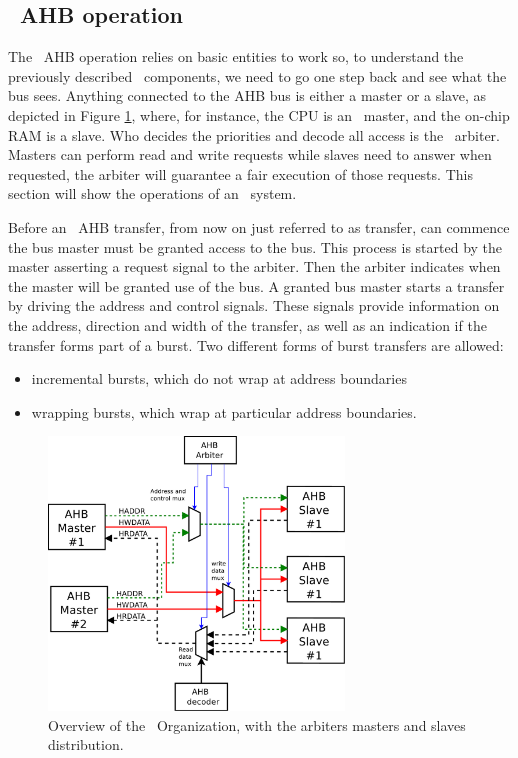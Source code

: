 \subsection{\amba~AHB operation}
\label{subsec:ahbops}
The \amba~AHB operation relies on basic entities to work so, to understand the previously described \amba~components, we need to go one step back and see what the bus sees.  Anything connected to the AHB bus is either a master or a slave, as depicted in Figure \ref{fig:internorg}, where, for instance, the CPU is an \amba~master, and the on-chip RAM is a slave. Who decides the priorities and decode all access is the \amba~arbiter. Masters can perform read and write requests while slaves need to answer when requested, the arbiter will guarantee a fair execution of those requests. This section will show the operations of an \amba~system.

Before an \amba~AHB transfer, from now on just referred to as transfer, can commence the bus master must be granted access to the bus. This process is started by the master asserting a request signal to the arbiter. Then the arbiter indicates when the master will be granted use of the bus. A granted bus master starts a transfer by driving the address and control signals. These signals provide information on the address, direction and width of the transfer, as well as an indication if the transfer forms part of a burst. Two different forms of burst transfers are allowed:
\begin{itemize}
\item incremental bursts, which do not wrap at address boundaries
\item wrapping bursts, which wrap at particular address boundaries.
\end{itemize}
\begin{figure}[!ht]
    \centering
    \includegraphics[width=0.7\textwidth]{figures/pdf/amba2_arbiter.pdf}
    \caption{Overview  of the \amba~Organization, with the arbiters masters and slaves distribution.}
    \label{fig:internorg}
\end{figure}

